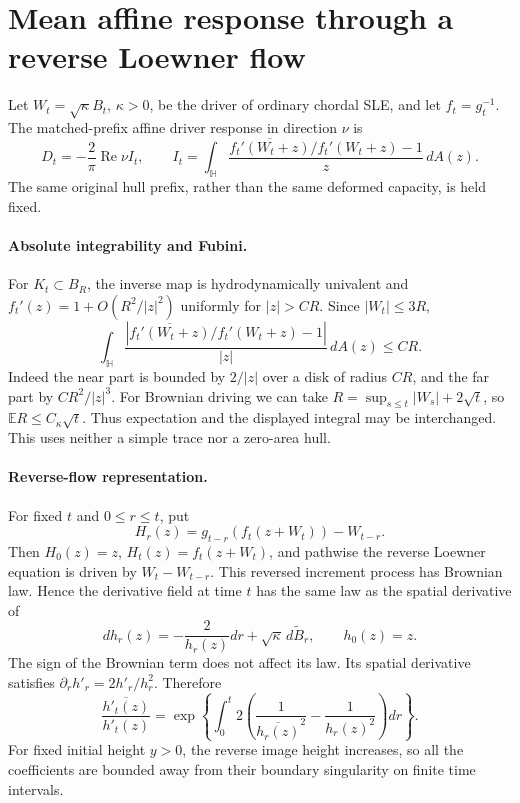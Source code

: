 \documentclass[11pt]{article}
\theoremstyle{definition}\newtheorem{definition}[theorem]{Definition}
\theoremstyle{remark}\newtheorem{remark}[theorem]{Remark}
\begin{document}
\section{Mean affine response through a reverse Loewner flow}
\label{sec:reverse-affine-response}

Let $W_t=\sqrt\kappa B_t$, $\kappa>0$, be the driver of ordinary
chordal SLE, and let $f_t=g_t^{-1}$. The matched-prefix affine driver
response in direction $\nu$ is
\[
 D_t=-\frac2\pi\operatorname{Re}\nu I_t,\qquad
 I_t=\int_{\mathbb H}\frac{
 \overline{f_t'(W_t+z)}/f_t'(W_t+z)-1}{z}\,dA(z).
\]
The same original hull prefix, rather than the same deformed capacity,
is held fixed.

\paragraph{Absolute integrability and Fubini.}
For $K_t\subset B_R$, the inverse map is hydrodynamically univalent and
$f_t'(z)=1+O(R^2/|z|^2)$ uniformly for $|z|>CR$. Since $|W_t|\le3R$,
\[
 \int_{\mathbb H}\frac{|\overline{f_t'(W_t+z)}/f_t'(W_t+z)-1|}{|z|}
 \,dA(z)\le CR.
\]
Indeed the near part is bounded by $2/|z|$ over a disk of radius $CR$,
and the far part by $CR^2/|z|^3$. For Brownian driving we can take
$R=\sup_{s\le t}|W_s|+2\sqrt t$, so $\mathbb ER\le C_\kappa\sqrt t$.
Thus expectation and the displayed integral may be interchanged. This
uses neither a simple trace nor a zero-area hull.

\paragraph{Reverse-flow representation.}
For fixed $t$ and $0\le r\le t$, put
\[
 H_r(z)=g_{t-r}(f_t(z+W_t))-W_{t-r}.
\]
Then $H_0(z)=z$, $H_t(z)=f_t(z+W_t)$, and pathwise the reverse
Loewner equation is driven by $W_t-W_{t-r}$. This reversed increment
process has Brownian law. Hence the derivative field at time $t$ has
the same law as the spatial derivative of
\[
 dh_r(z)=-\frac2{h_r(z)}dr+\sqrt\kappa\,d\widetilde B_r,
 \qquad h_0(z)=z.
\]
The sign of the Brownian term does not affect its law. Its spatial
derivative satisfies $\partial_rh'_r=2h'_r/h_r^2$. Therefore
\[
 \frac{\overline{h'_t(z)}}{h'_t(z)}
 =\exp\left\{\int_0^t
  2\left(\frac1{\overline{h_r(z)}^2}-\frac1{h_r(z)^2}\right)dr\right\}.
\]
For fixed initial height $y>0$, the reverse image height increases, so
all the coefficients are bounded away from their boundary singularity
on finite time intervals.
\end{document}
